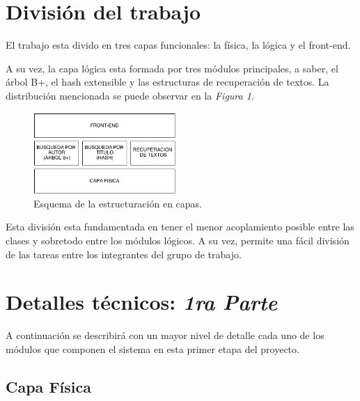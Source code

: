 \documentclass{article}
\begin{document}
\section{División del trabajo}

	El trabajo esta divido en tres capas funcionales: la física, la lógica y el front-end.
	\par
	A su vez, la capa lógica esta formada por tres módulos principales, a saber, el árbol B+, el hash extensible y las estructuras de recuperación de textos. La distribución mencionada se puede observar en la \textit{Figura 1}.
	\bigskip\medskip


\begin{figure}[h]
	\centering
	\includegraphics[width=0.48\textwidth]{images/DivisionModulos.png}
	\medskip
	\caption{Esquema de la estructuración en capas.}
\end{figure}
\bigskip\smallskip


	Esta división esta fundamentada en tener el menor acoplamiento posible entre las clases y sobretodo entre los módulos lógicos. A su vez, permite una fácil división de las tareas entre los integrantes del grupo de trabajo.
	\medskip




\section{Detalles técnicos: \textit{1ra Parte}}

	A continuación se describirá con un mayor nivel de detalle cada uno de los módulos que componen el sistema en esta primer etapa del proyecto. \\


\subsection{Capa Física}
	
\end{document}
